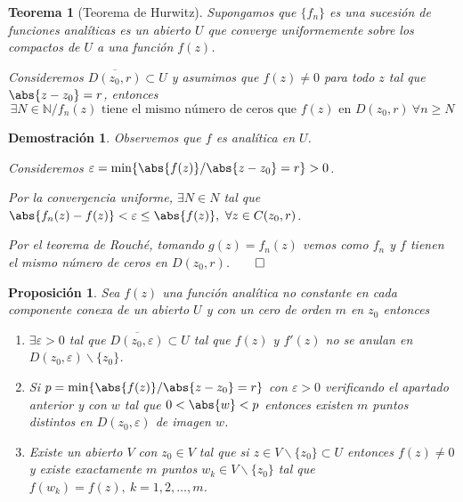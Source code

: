 \documentclass[12pt]{book}
\newtheorem{theorem}{Teorema}[chapter]
\newtheorem{prop}{Proposición}[chapter]
\newtheorem*{dem}{Demostración}
\newcommand{\N}{\mathbb{N}}
\begin{document}
\begin{theorem}[Teorema de Hurwitz]
Supongamos que $\{f_n\}$ es una sucesión de funciones analíticas es un abierto $U$ que converge uniformemente sobre los compactos de $U$ a una función $f(z)$.

Consideremos $\overline{D(z_0,r)}\subset U$ y asumimos que $f(z)\neq 0$ para todo $z$ tal que $\abs{z-z_0}=r$, entonces
$$
\exists N\in\N / f_n(z) \text{ tiene el mismo número de ceros que } f(z) \text{ en } D(z_0,r)\ \forall n\geq N
$$
\end{theorem}

\begin{dem}
Observemos que $f$ es analítica en $U$.

Consideremos $\varepsilon = \min\{\abs{f(z)}/\abs{z-z_0}= r\}>0$.

Por la convergencia uniforme, $\exists N \in N$ tal que $\abs{f_n(z)-f(z)}<\varepsilon \leq \abs{f(z)},\ \forall z\in C(z_0,r)$.

Por el teorema de Rouché, tomando $g(z) = f_n(z)$ vemos como $f_n$ y $f$ tienen el mismo número de ceros en $D(z_0,r)$.$\qed$
\end{dem}

\begin{prop}
Sea $f(z)$ una función analítica no constante en cada componente conexa de un abierto $U$ y con un cero de orden $m$ en $z_0$ entonces 
\begin{enumerate}
\item $\exists \varepsilon>0$ tal que $\overline{D(z_0,\varepsilon)}\subset U$ tal que $f(z)$ y $f'(z)$ no se anulan en $D(z_0,\varepsilon)\backslash\{z_0\}$.
\item Si $p = \min\{\abs{f(z)}/ \abs{z-z_0}=r\}$ con $\varepsilon >0$ verificando el apartado anterior y con $w$ tal que $0<\abs{w}<p$ entonces existen $m$ puntos distintos en $D(z_0,\varepsilon)$ de imagen $w$.
\item Existe un abierto $V$ con $z_0\in V$ tal que si $z\in V\backslash\{z_0\}\subset U$ entonces $f(z)\neq 0$ y existe exactamente $m$ puntos $w_k\in V\backslash\{z_0\}$ tal que $f(w_k) = f(z),\ k = 1,2,\ldots,m$.
\end{enumerate}
\end{prop}
\end{document}
